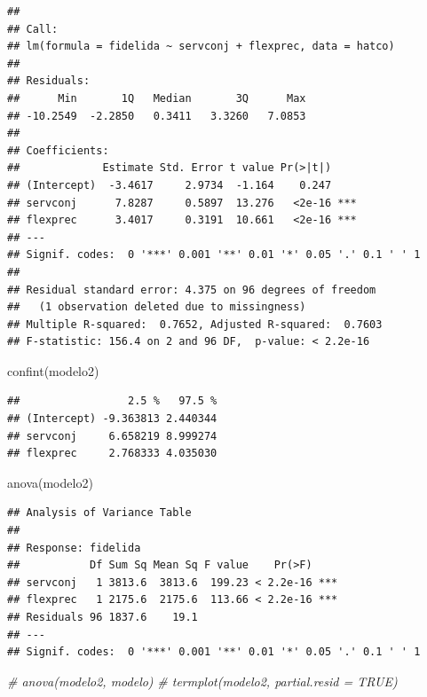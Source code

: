 \documentclass[
]{book}
\newenvironment{Shaded}{\begin{snugshade}}{\end{snugshade}}
\newcommand{\CommentTok}[1]{\textcolor[rgb]{0.56,0.35,0.01}{\textit{#1}}}
\newcommand{\FunctionTok}[1]{\textcolor[rgb]{0.00,0.00,0.00}{#1}}
\newcommand{\NormalTok}[1]{#1}
\theoremstyle{break}
\begin{document}
\begin{verbatim}
## 
## Call:
## lm(formula = fidelida ~ servconj + flexprec, data = hatco)
## 
## Residuals:
##      Min       1Q   Median       3Q      Max 
## -10.2549  -2.2850   0.3411   3.3260   7.0853 
## 
## Coefficients:
##             Estimate Std. Error t value Pr(>|t|)    
## (Intercept)  -3.4617     2.9734  -1.164    0.247    
## servconj      7.8287     0.5897  13.276   <2e-16 ***
## flexprec      3.4017     0.3191  10.661   <2e-16 ***
## ---
## Signif. codes:  0 '***' 0.001 '**' 0.01 '*' 0.05 '.' 0.1 ' ' 1
## 
## Residual standard error: 4.375 on 96 degrees of freedom
##   (1 observation deleted due to missingness)
## Multiple R-squared:  0.7652, Adjusted R-squared:  0.7603 
## F-statistic: 156.4 on 2 and 96 DF,  p-value: < 2.2e-16
\end{verbatim}

\begin{Shaded}
\begin{Highlighting}[]
\FunctionTok{confint}\NormalTok{(modelo2)}
\end{Highlighting}
\end{Shaded}

\begin{verbatim}
##                 2.5 %   97.5 %
## (Intercept) -9.363813 2.440344
## servconj     6.658219 8.999274
## flexprec     2.768333 4.035030
\end{verbatim}

\begin{Shaded}
\begin{Highlighting}[]
\FunctionTok{anova}\NormalTok{(modelo2)}
\end{Highlighting}
\end{Shaded}

\begin{verbatim}
## Analysis of Variance Table
## 
## Response: fidelida
##           Df Sum Sq Mean Sq F value    Pr(>F)    
## servconj   1 3813.6  3813.6  199.23 < 2.2e-16 ***
## flexprec   1 2175.6  2175.6  113.66 < 2.2e-16 ***
## Residuals 96 1837.6    19.1                      
## ---
## Signif. codes:  0 '***' 0.001 '**' 0.01 '*' 0.05 '.' 0.1 ' ' 1
\end{verbatim}

\begin{Shaded}
\begin{Highlighting}[]
\CommentTok{\# anova(modelo2, modelo)}
\CommentTok{\# termplot(modelo2, partial.resid = TRUE)}
\end{Highlighting}
\end{Shaded}
\end{document}
